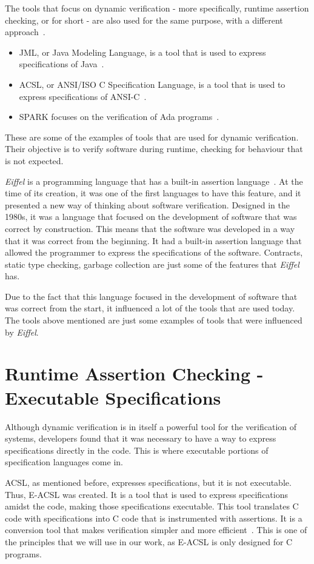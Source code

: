 The tools that focus on dynamic verification - more specifically, runtime assertion checking, 
or \rac for short - are also used for the same purpose, with a different approach~\cite{Maurica2018}.
\begin{itemize}
  \item JML, or Java Modeling Language, is a tool that is used to express specifications of Java~\cite{Leavens2008}.
  \item ACSL, or ANSI/ISO C Specification Language, is a tool that is used to express specifications of ANSI-C~\cite{Baudin}.
  \item SPARK focuses on the verification of Ada programs~\cite{Spark2022}.
\end{itemize}
These are some of the examples of tools that are used for dynamic verification. Their objective 
is to verify software during runtime, checking for behaviour that is not expected.

\textit{Eiffel} is a programming language that has a built-in assertion language~\cite{Maurica2018}. 
At the time of its creation, it was one of the first languages to have this feature, and it presented 
a new way of thinking about software verification. Designed in the 1980s, it was a language that 
focused on the development of software that was correct by construction. This means that the 
software was developed in a way that it was correct from the beginning. It had a built-in assertion 
language that allowed the programmer to express the specifications of the software. Contracts, 
static type checking, garbage collection are just some of the features that \textit{Eiffel} has. 

Due to the fact that this language focused in the development of software that was correct from the 
start, it influenced a lot of the tools that are used today. The tools above mentioned are 
just some examples of tools that were influenced by \textit{Eiffel}.

\section{Runtime Assertion Checking - Executable Specifications}
\label{sec:runtime_assertion_checking_executable_specifications}

Although dynamic verification is in itself a powerful tool for the verification of systems, 
developers found that it was necessary to have a way to express specifications directly in the 
code. This is where executable portions of specification languages come in. 

ACSL, as mentioned before, expresses specifications, but it is not executable. Thus, 
E-ACSL was created. It is a tool that is used to express specifications 
amidst the code, making those specifications executable. This tool translates C code with 
specifications into C code that is instrumented with assertions. It is a conversion tool 
that makes verification simpler and more efficient~\cite{Maurica2018}. This is one of the 
principles that we will use in our work, as E-ACSL is only designed for C programs.